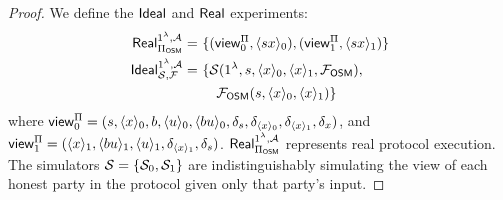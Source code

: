 \begin{proof}
We define the $\mathsf{Ideal}$ and $\mathsf{Real}$ experiments:
	\begin{equation*}
		\begin{aligned}
			\real^{1^\lambda,\A}_{\Pi_\SM}=&\ \{(\view_0^{\Pi},\l sx\r_0), (\view_1^{\Pi},\l sx\r_1)\} \\
			\ideal^{1^\lambda, \A}_{\Scal, \F}=&\ \{\Scal(1^\lambda,s,\l x\r_0,\l x\r_1,\F_\SM),\\&\ \ \ \ \F_\SM(s,\l x\r_0,\l x\r_1)\}
		\end{aligned}
	\end{equation*}
	where 
	$\mathsf{view}_0^{\Pi}=(s, \langle x\rangle_0, b, \langle u \rangle_0, \langle bu \rangle_0,\delta_s, \allowbreak\delta_{\langle x\rangle_0},\delta_{\langle x\rangle_1},\delta_x)$, and 
	$\mathsf{view}_1^{\Pi}=(\langle x\rangle_1, \langle bu \rangle_1, \langle u \rangle_1, \delta_{\langle x\rangle_1}, \delta_s)$.
	$\mathsf{Real}^{1^\lambda,\mathcal{A}}_{\Pi_{\mathsf{OSM}}}$ represents real protocol execution.
	The simulators $\mathcal{S}=\{\mathcal{S}_0,\mathcal{S}_1\}$ are indistinguishably simulating the view of each honest party in the protocol given only that party's input.
 

\end{proof}
